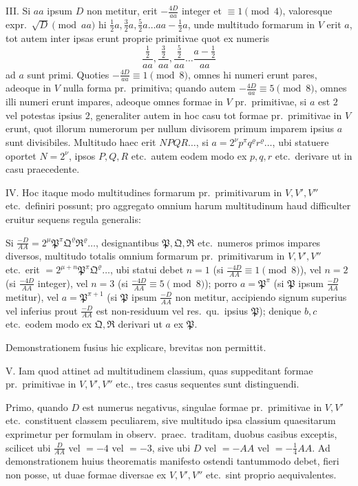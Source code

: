 \documentclass[12pt,a4paper]{article}
\theoremstyle{plain}
\theoremstyle{definition}
\theoremstyle{remark}
\theoremstyle{problemstyle}
\begin{document}
III. Si $aa$ ipsum $D$ non metitur, erit $-\frac{4D}{aa}$ integer et $\equiv 1 \pmod{4}$, valoresque expr.\ $\sqrt{D} \pmod{aa}$ hi $\tfrac{1}{2}a, \tfrac{3}{2}a, \tfrac{5}{2}a \ldots aa - \tfrac{1}{2}a$, unde multitudo formarum in $V$ erit $a$, tot autem inter ipsas erunt proprie primitivae quot ex numeris
\[
\frac{\tfrac{1}{2}}{aa}, \frac{\tfrac{3}{2}}{aa}, \frac{\tfrac{5}{2}}{aa} \ldots \frac{a - \tfrac{1}{2}}{aa}
\]
ad $a$ sunt primi. Quoties $-\frac{4D}{aa} \equiv 1 \pmod{8}$, omnes hi numeri erunt pares, adeoque in $V$ nulla forma pr.\ primitiva; quando autem $-\frac{4D}{aa} \equiv 5 \pmod{8}$, omnes illi numeri erunt impares, adeoque omnes formae in $V$ pr.\ primitivae, si $a$ est $2$ vel potestas ipsius $2$, generaliter autem in hoc casu tot formae pr.\ primitivae in $V$ erunt, quot illorum numerorum per nullum divisorem primum imparem ipsius $a$ sunt divisibiles. Multitudo haec erit $NPQR\ldots$, si $a = 2^\nu p^\pi q^\varrho r^\varrho \ldots$, ubi statuere oportet $N = 2^\nu$, ipsos $P, Q, R$ etc.\ autem eodem modo ex $p, q, r$ etc.\ derivare ut in casu praecedente.

IV. Hoc itaque modo multitudines formarum pr.\ primitivarum in $V, V', V''$ etc.\ definiri possunt; pro aggregato omnium harum multitudinum haud difficulter eruitur sequens regula generalis:

Si $\frac{-D}{AA} = 2^\mu \mathfrak{P}^\pi \mathfrak{Q}^\varrho \mathfrak{R}^\varrho \ldots$, designantibus $\mathfrak{P}, \mathfrak{Q}, \mathfrak{R}$ etc.\ numeros primos impares diversos, multitudo totalis omnium formarum pr.\ primitivarum in $V, V', V''$ etc.\ erit $= 2^{\mu + n} \mathfrak{P}^\pi \mathfrak{Q}^\varrho \ldots$, ubi statui debet $n = 1$ (si $\frac{-4D}{AA} \equiv 1 \pmod{8}$), vel $n = 2$ (si $\frac{-4D}{AA}$ integer), vel $n = 3$ (si $\frac{-4D}{AA} \equiv 5 \pmod{8}$); porro $a = \mathfrak{P}^\pi$ (si $\mathfrak{P}$ ipsum $\frac{-D}{AA}$ metitur), vel $a = \mathfrak{P}^{\pi + 1}$ (si $\mathfrak{P}$ ipsum $\frac{-D}{AA}$ non metitur, accipiendo signum superius vel inferius prout $\frac{-D}{AA}$ est non-residuum vel res.\ qu.\ ipsius $\mathfrak{P}$); denique $b, c$ etc.\ eodem modo ex $\mathfrak{Q}, \mathfrak{R}$ derivari ut $a$ ex $\mathfrak{P}$.

Demonstrationem fusius hic explicare, brevitas non permittit.

V. Iam quod attinet ad multitudinem classium, quas suppeditant formae pr.\ primitivae in $V, V', V''$ etc., tres casus sequentes sunt distinguendi.

Primo, quando $D$ est numerus negativus, singulae formae pr.\ primitivae in $V, V'$ etc.\ constituent classem peculiarem, sive multitudo ipsa classium quaesitarum exprimetur per formulam in observ.\ praec.\ traditam, duobus casibus exceptis, scilicet ubi $\frac{D}{AA}$ vel $= -4$ vel $= -3$, sive ubi $D$ vel $= -AA$ vel $= -\tfrac{1}{4}AA$. Ad demonstrationem huius theorematis manifesto ostendi tantummodo debet, fieri non posse, ut duae formae diversae ex $V, V', V''$ etc.\ sint proprio aequivalentes.
\end{document}
